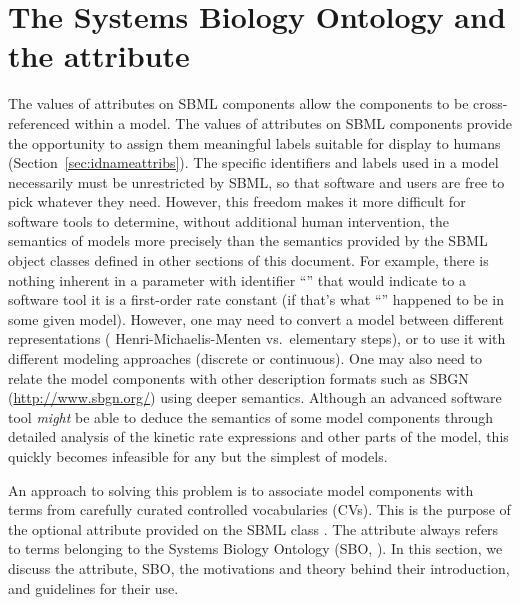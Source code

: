 
\section{The Systems Biology Ontology and the  attribute}
\label{sec:sboTerm}
\label{sec:sbo}

The values of  attributes on SBML components allow the
components to be cross-referenced within a model. The values of
 attributes on SBML components provide the opportunity
to assign them meaningful labels suitable for display to humans
(Section~\ref{sec:idnameattribs}).  The specific identifiers and
labels used in a model necessarily must be unrestricted by SBML,
so that software and users are free to pick whatever they need.
However, this freedom makes it more difficult for software tools
to determine, without additional human intervention, the semantics
of models more precisely than the semantics provided by the SBML
object classes defined in other sections of this document.  For
example, there is nothing inherent in a parameter with identifier
``'' that would indicate to a software tool it is a
first-order rate constant (if that's what ``'' happened
to be in some given model).  However, one may need to convert a
model between different representations (\eg
Henri-Michaelis-Menten vs.\ elementary steps), or to use it with
different modeling approaches (discrete or continuous).  One may
also need to relate the model components with other description
formats such as SBGN (\url{http://www.sbgn.org/}) using deeper
semantics.  Although an advanced software tool \emph{might} be
able to deduce the semantics of some model components through
detailed analysis of the kinetic rate expressions and other parts
of the model, this quickly becomes infeasible for any but the
simplest of models.

An approach to solving this problem is to associate model
components with terms from carefully curated controlled
vocabularies (CVs).  This is the purpose of the optional
 attribute provided on the SBML
class \SBase.  The  attribute always refers to
terms belonging to the Systems Biology Ontology (SBO, \sboref). In
this section, we discuss the  attribute,
SBO, the motivations and theory behind their introduction, and
guidelines for their use.

